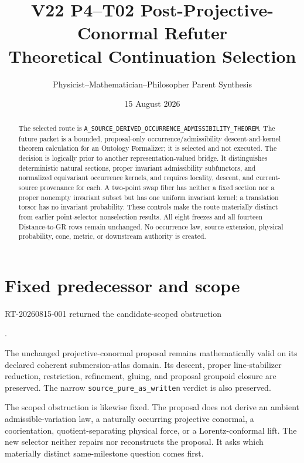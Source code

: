 \documentclass[11pt]{article}
\title{V22 P4--T02 Post-Projective-Conormal Refuter\\
Theoretical Continuation Selection}
\author{Physicist--Mathematician--Philosopher Parent Synthesis}
\date{15 August 2026}
\begin{document}
\maketitle

\begin{abstract}
The selected route is
\texttt{A\_SOURCE\_DERIVED\_OCCURRENCE\_ADMISSIBILITY\_THEOREM}.
The future packet is a bounded, proposal-only occurrence/admissibility
descent-and-kernel theorem calculation for an Ontology Formalizer; it is
selected and not executed.  The decision is logically prior to another
representation-valued bridge.  It distinguishes deterministic natural
sections, proper invariant admissibility subfunctors, and normalized
equivariant occurrence kernels, and requires locality, descent, and
current-source provenance for each.  A two-point swap fiber has neither a
fixed section nor a proper nonempty invariant subset but has one uniform
invariant kernel; a translation torsor has no invariant probability.  These
controls make the route materially distinct from earlier point-selector
nonselection results.  All eight freezes and all fourteen Distance-to-GR
rows remain unchanged.  No occurrence law, source extension, physical
probability, cone, metric, or downstream authority is created.
\end{abstract}

\section{Fixed predecessor and scope}

RT-20260815-001 returned the candidate-scoped obstruction
\begin{center}
\small
{}.
\end{center}
The unchanged projective-conormal proposal remains mathematically valid on
its declared coherent submersion-atlas domain.  Its descent, proper
line-stabilizer reduction, restriction, refinement, gluing, and proposal
groupoid closure are preserved.  The narrow
\texttt{source\_pure\_as\_written} verdict is also preserved.

The scoped obstruction is likewise fixed.  The proposal does not derive an
ambient admissible-variation law, a naturally occurring projective conormal,
a coorientation, quotient-separating physical force, or a Lorentz-conformal
lift.  The new selector neither repairs nor reconstructs the proposal.  It
asks which materially distinct same-milestone question comes first.
\end{document}
